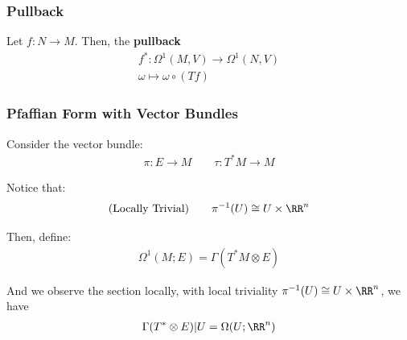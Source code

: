\documentclass[Total.tex]{subfiles}
\begin{document}
			\subsubsection{Pullback}
			
			\begin{Def}
				Let $f:N\rightarrow M$. Then, the \textbf{pullback}
				\begin{gather*}
					f^*:\Omega^1(M,V)\rightarrow \Omega^1(N,V)\\
					\omega\mapsto \omega\circ (Tf)
				\end{gather*}
			\end{Def}
			
			\subsubsection{Pfaffian Form with Vector Bundles}
				\qquad Consider the vector bundle:
				\begin{gather*}
					\pi:E\rightarrow M\qquad \tau:T^*M\rightarrow M
				\end{gather*}
				
				Notice that:
				\begin{gather*}
					\mbox{(Locally Trivial)}\qquad \pi^{-1}(U)\cong U\times \RR^n
				\end{gather*}
				
				Then, define:
				\begin{gather*}
					\Omega^1(M;E)=\Gamma(T^*M\otimes E)
				\end{gather*}
				
				And we observe the section locally, with local triviality $\pi^{-1}(U)\cong U\times \RR^n$, we have
				\begin{gather*}
					\Gamma(T^*\otimes E)|U=\Omega(U;\RR^n)
				\end{gather*}
\end{document}
